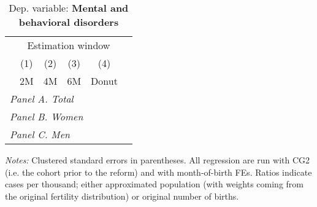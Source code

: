  \begin{table}[htbp] \centering \begin{threeparttable} \centering \caption{Dep. variable: \textbf{Mental and behavioral disorders}} {\def\sym#1{\ifmmode^{#1}\else\(^{#1}\)\fi} \begin{tabular}{l*{5}{c}} \toprule & \multicolumn{4}{c}{Estimation window} \\ \cmidrule(lr){2-5}
            &\multicolumn{1}{c}{(1)}&\multicolumn{1}{c}{(2)}&\multicolumn{1}{c}{(3)}&\multicolumn{1}{c}{(4)}\\
            &\multicolumn{1}{c}{2M}&\multicolumn{1}{c}{4M}&\multicolumn{1}{c}{6M}&\multicolumn{1}{c}{Donut}\\
\midrule
 \multicolumn{5}{l}{\emph{Panel A. Total}} \\      \midrule\multicolumn{5}{l}{\emph{Panel B. Women}} \\      \midrule\multicolumn{5}{l}{\emph{Panel C. Men}} \\      
\bottomrule \end{tabular} } \begin{tablenotes} \item \scriptsize \emph{Notes:} Clustered standard errors in parentheses. All regression are run with CG2 (i.e. the cohort prior to the reform) and with month-of-birth FEs. Ratios indicate cases per thousand; either approximated population (with weights coming from the original fertility distribution) or original number of births. \end{tablenotes} \end{threeparttable} \end{table} 
